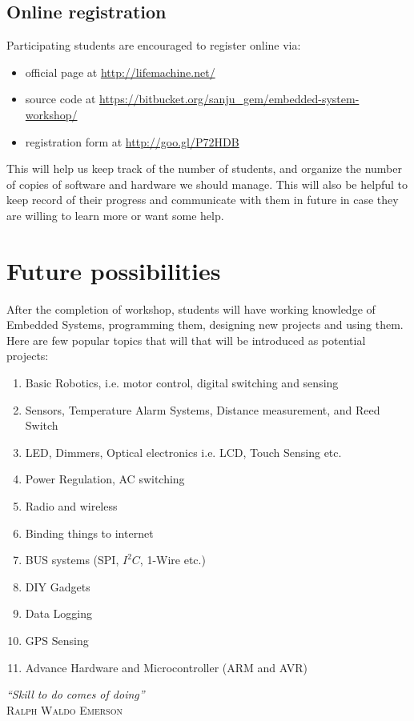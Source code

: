 \documentclass[12pt]{article} %
\begin{document}
\pagebreak

\subsection{Online registration} %
Participating students are encouraged to register online via: 
\begin{itemize}
\item official page at \url{http://lifemachine.net/}
\item source code at \url{https://bitbucket.org/sanju_gem/embedded-system-workshop/}
\item registration form at \url{http://goo.gl/P72HDB}
\end{itemize}
This will help us keep track of the number of students, and organize the number of copies of software and hardware we should manage. This will also be helpful to keep record of their progress and communicate with them in future in case they are willing to learn more or want some help.

\section{Future possibilities} %
After the completion of workshop, students will have working knowledge of Embedded Systems, programming them, designing new projects and using them. Here are few popular topics that will that will be introduced as potential projects:
\begin{enumerate}
\item Basic Robotics, i.e. motor control, digital switching and sensing
\item Sensors, Temperature Alarm Systems, Distance measurement, and Reed Switch
\item LED, Dimmers, Optical electronics i.e. LCD, Touch Sensing etc.
\item Power Regulation, AC switching
\item Radio and wireless
\item Binding things to internet  
\item BUS systems (SPI, $I^2C$, 1-Wire etc.)
\item DIY Gadgets
\item Data Logging
\item GPS Sensing
\item Advance Hardware and Microcontroller (ARM and AVR)
\end{enumerate}
\vspace{0.5cm}
\emph{\large “Skill to do comes of doing”}\\
\textsc {Ralph Waldo Emerson}
\end{document}
